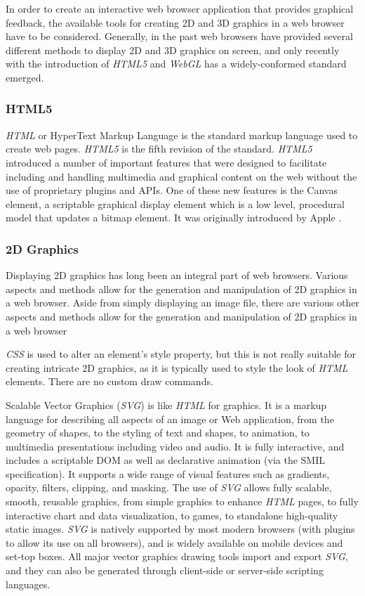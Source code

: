 \documentclass[a4paper,11pt,titlepage]{article}
\begin{document}
In order to create an interactive web browser application that provides graphical feedback, the available tools for creating 2D and 3D graphics in a web browser have to be considered. Generally, in the past web browsers have provided several different methods to display 2D and 3D graphics on screen, and only recently with the introduction of \textit{HTML5} and \textit{WebGL} has a widely-conformed standard emerged.

\subsubsection{HTML5}

\textit{HTML} or HyperText Markup Language is the standard markup language used to create web pages. \textit{HTML5} is the fifth revision of the standard. \textit{HTML5} introduced a number of important features that were designed to facilitate including and handling multimedia and graphical content on the web without the use of proprietary plugins and APIs. One of these new features is the Canvas element, a scriptable graphical display element which is a low level, procedural model that updates a bitmap element. It was originally introduced by Apple \cite{canvas} .

\subsubsection{2D Graphics}

Displaying 2D graphics has long been an integral part of web browsers. Various aspects and methods allow for the generation and manipulation of 2D graphics in a web browser. Aside from simply displaying an image file, there are various other aspects and methods allow for the generation and manipulation of 2D graphics in a web browser

\textit{CSS} is used to alter an element's style property, but this is not really suitable for creating intricate 2D graphics, as it is typically used to style the look of \textit{HTML} elements. There are no custom draw commands.

Scalable Vector Graphics (\textit{SVG}) is like \textit{HTML} for graphics\cite{svg}. It is a markup language for describing all aspects of an image or Web application, from the geometry of shapes, to the styling of text and shapes, to animation, to multimedia presentations including video and audio. It is fully interactive, and includes a scriptable DOM as well as declarative animation (via the SMIL specification). It supports a wide range of visual features such as gradients, opacity, filters, clipping, and masking.
The use of \textit{SVG} allows fully scalable, smooth, reusable graphics, from simple graphics to enhance \textit{HTML} pages, to fully interactive chart and data visualization, to games, to standalone high-quality static images. \textit{SVG} is natively supported by most modern browsers (with plugins to allow its use on all browsers), and is widely available on mobile devices and set-top boxes. All major vector graphics drawing tools import and export \textit{SVG}, and they can also be generated through client-side or server-side scripting languages.
\end{document}
